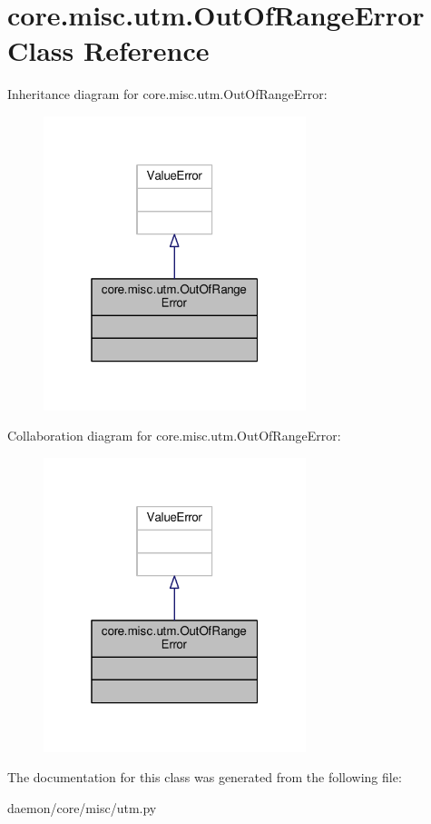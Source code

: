 \hypertarget{classcore_1_1misc_1_1utm_1_1_out_of_range_error}{\section{core.\+misc.\+utm.\+Out\+Of\+Range\+Error Class Reference}
\label{classcore_1_1misc_1_1utm_1_1_out_of_range_error}
}


Inheritance diagram for core.\+misc.\+utm.\+Out\+Of\+Range\+Error\+:
\nopagebreak
\begin{figure}[H]
\begin{center}
\leavevmode
\includegraphics[width=217pt]{classcore_1_1misc_1_1utm_1_1_out_of_range_error__inherit__graph}
\end{center}
\end{figure}


Collaboration diagram for core.\+misc.\+utm.\+Out\+Of\+Range\+Error\+:
\nopagebreak
\begin{figure}[H]
\begin{center}
\leavevmode
\includegraphics[width=217pt]{classcore_1_1misc_1_1utm_1_1_out_of_range_error__coll__graph}
\end{center}
\end{figure}


The documentation for this class was generated from the following file\+:\begin{DoxyCompactItemize}
\item 
daemon/core/misc/utm.\+py\end{DoxyCompactItemize}
